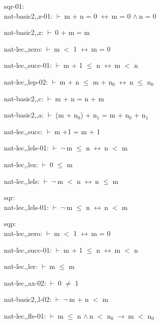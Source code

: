 \documentclass[a4paper]{article}
\newcommand{\Fol}{\mbox{$\vdash\ $}}
\newcommand{\Not}{\mbox{$\neg\ $}}
\newcommand{\And}{\mbox{$\wedge\ $}}
\newcommand{\Imp}{\mbox{$\rightarrow\ $}}
\newcommand{\Equiv}{\mbox{$\leftrightarrow\ $}}
\begin{document}
\bigskip

sqr-01:\\ nat-basic2,,z-01: 
 \Fol m + n = 0 \Equiv m = 0 \And n = 0



nat-basic2,,z: 
 \Fol 0 + m = m



nat-lec,,zero: 
 \Fol m $<$ 1 \Equiv m = 0



nat-lec,,succ-01: 
 \Fol m + 1 $\le$ n \Equiv m $<$ n



nat-lec,,lep-02: 
 \Fol m + n $\le$ m + $\mbox{n}_{0}$ \Equiv n $\le$ $\mbox{n}_{0}$



nat-basic2,,c: 
 \Fol m + n = n + m



nat-basic2,,a: 
 \Fol (m + $\mbox{n}_{0}$) + $\mbox{n}_{1}$ = m + $\mbox{n}_{0}$ + $\mbox{n}_{1}$



nat-lec,,succ: 
 \Fol m +1 = m + 1



nat-lec,,lels-01: 
 \Fol \Not m $\le$ n \Equiv n $<$ m



nat-lec,,lez: 
 \Fol 0 $\le$ m



nat-lec,,lels: 
 \Fol \Not m $<$ n \Equiv n $\le$ m



\bigskip

sqr:\\ nat-lec,,lels-01: 
 \Fol \Not m $\le$ n \Equiv n $<$ m



\bigskip

sqp:\\ nat-lec,,zero: 
 \Fol m $<$ 1 \Equiv m = 0



nat-lec,,succ-01: 
 \Fol m + 1 $\le$ n \Equiv m $<$ n



nat-lec,,ler: 
 \Fol m $\le$ m



nat-lec,,ax-02: 
 \Fol 0 $\neq$ 1



nat-basic2,,l-02: 
 \Fol \Not m + n $<$ m



nat-lec,,fle-01: 
 \Fol m $\le$ n \And n $<$ $\mbox{n}_{0}$ \Imp m $<$ $\mbox{n}_{0}$
\end{document}
